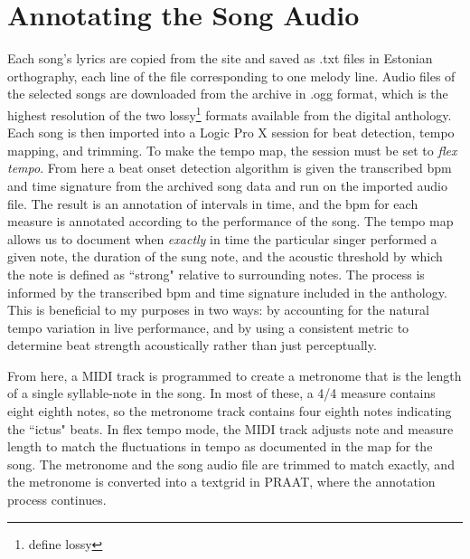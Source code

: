 \section{Annotating the Song Audio }



 Each song's lyrics are copied from the site and saved as .txt files in Estonian orthography, each line of the file corresponding to one melody line.  
Audio files of the selected songs are downloaded from the archive in .ogg format, which is the highest resolution of the two lossy\footnote{define lossy} formats available from the digital anthology. Each song is then imported into a Logic Pro X \citep{b131156} session for beat detection, tempo mapping, and trimming. 
To make the tempo map, the session must be set to {\it flex tempo}. From here a beat onset detection algorithm \citep{robertsonBKeeperBeattrackerLive2007} is  given the transcribed bpm and time signature from the archived song data and run on the imported audio file. The result is an annotation of intervals in time, and the bpm for each measure is annotated according to the performance of the song.
The tempo map allows us to document when {\it exactly} in time the particular singer performed a given note, the duration of the sung note, and the acoustic threshold by which the note is defined as ``strong" relative to surrounding notes. The process is informed by the transcribed bpm and time signature included in the anthology. This is beneficial to my purposes in two ways: by accounting for the natural tempo variation in live performance, and by using a consistent metric to determine beat strength acoustically rather than just perceptually.

 From here, a MIDI track is programmed to create a metronome that is the length of a single syllable-note in the song. In most of these, a 4/4 measure contains eight eighth notes, so the metronome track contains four eighth notes indicating the ``ictus" beats. In flex tempo mode, the MIDI track adjusts note and measure length to match the fluctuations in tempo as documented in the map for the song. The metronome and the song audio file are trimmed to match exactly, and the metronome is converted into a textgrid in PRAAT\citep{boersnaPraatDoingPhonetics2022}, where the annotation process continues. 

 


